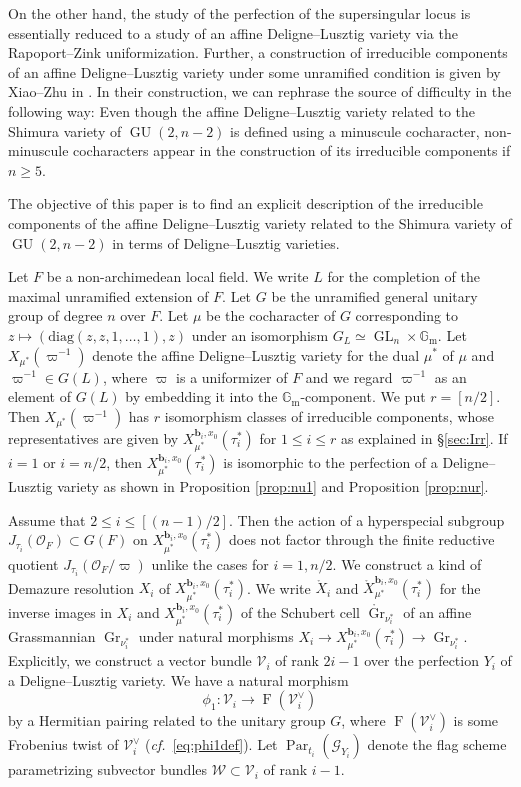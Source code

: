 \documentclass[12pt,a4paper]{article}
\DeclareMathOperator{\Gr}{Gr}
\DeclareMathOperator{\Par}{Par}
\DeclareMathOperator{\GL}{GL}
\DeclareMathOperator{\GU}{GU}
\DeclareMathOperator{\oF}{F}
\newcommand{\bfb}{\mathbf{b}}
\newcommand{\cO}{\mathcal{O}}
\newcommand{\sG}{\mathscr{G}}
\newcommand{\sV}{\mathscr{V}}
\newcommand{\sW}{\mathscr{W}}
\newcommand{\Gm}{\mathbb{G}_{\mathrm{m}}}
\newcommand{\cf}{\textit{cf.\ }}
\begin{document}
On the other hand, 
the study of the perfection of the supersingular locus is essentially reduced to a study of an affine Deligne--Lusztig variety via 
the Rapoport--Zink uniformization. 
Further, a construction of irreducible components of an 
affine Deligne--Lusztig variety under some unramified condition is given by Xiao--Zhu in \cite{XiZhCycSh}. 
In their construction, we can rephrase the source of difficulty in the following way: 
Even though the affine Deligne--Lusztig variety 
related to the Shimura variety of $\GU (2,n-2)$ 
is defined using a minuscule cocharacter, 
non-minuscule cocharacters appear in 
the construction of 
its irreducible components if $n \geq 5$. 

The objective of this paper is 
to find an explicit description of the irreducible components of the affine Deligne--Lusztig variety related to 
the Shimura variety of $\GU (2,n-2)$ in terms of 
Deligne--Lusztig varieties. 

Let $F$ be a non-archimedean local field. 
We write $L$ for the completion of the maximal unramified extension of 
$F$. 
Let $G$ be the unramified general unitary group of degree $n$ 
over $F$. 
Let $\mu$ be the cocharacter of $G$ 
corresponding to 
$z \mapsto (\mathrm{diag}(z,z,1,\ldots,1),z)$ under an 
isomorphism $G_L \simeq \GL_n \times \Gm$. 
Let $X_{\mu^*}(\varpi^{-1})$ denote the affine Deligne--Lusztig variety 
for the dual $\mu^*$ of $\mu$ and $\varpi^{-1} \in G(L)$, 
where $\varpi$ is a uniformizer of $F$ and we regard $\varpi^{-1}$ as an element of $G(L)$ by embedding it into 
the $\Gm$-component. 
We put $r=[n/2]$. 
Then $X_{\mu^*}(\varpi^{-1})$ has $r$ isomorphism classes of irreducible components, whose representatives are given by $X_{\mu^*}^{\bfb_i,x_0}(\tau_i^*)$ for $1 \leq i \leq r$ as explained in \S \ref{sec:Irr}. 
If $i=1$ or $i=n/2$, then 
$X_{\mu^*}^{\bfb_i,x_0}(\tau_i^*)$ is isomorphic to the perfection of a Deligne--Lusztig variety as shown in 
Proposition \ref{prop:nu1} and Proposition \ref{prop:nur}. 

Assume that $2 \leq i \leq [(n-1)/2]$. 
Then the action of 
a hyperspecial subgroup $J_{\tau_i}(\cO_F) \subset G(F)$ 
on $X_{\mu^*}^{\bfb_i,x_0}(\tau_i^*)$ does not factor through the finite reductive quotient $J_{\tau_i}(\cO_F/\varpi)$ unlike the cases for $i=1,n/2$. 
We construct a kind of Demazure resolution 
$X_i$ of $X_{\mu^*}^{\bfb_i,x_0}(\tau_i^*)$. 
We write $\mathring{X}_i$ and $\mathring{X}_{\mu^*}^{\bfb_i,x_0}(\tau_i^*)$ for the inverse images in 
$X_i$ and $X_{\mu^*}^{\bfb_i,x_0}(\tau_i^*)$ 
of the Schubert cell $\mathring{\Gr}_{\nu_i^*}$ of an affine Grassmannian $\Gr_{\nu_i^*}$ under natural morphisms $X_i \to X_{\mu^*}^{\bfb_i,x_0}(\tau_i^*) \to  \Gr_{\nu_i^*}$. 
Explicitly, we construct a vector bundle 
$\sV_i$ of rank $2i-1$ over the perfection $Y_i$ 
of a Deligne--Lusztig variety. 
We have a natural morphism 
\[
 \phi_1 \colon \sV_i \to \oF (\sV_i^{\vee})
\]
by a Hermitian pairing related to the unitary group $G$, where 
$\oF (\sV_i^{\vee})$ is some Frobenius twist of $\sV_i^{\vee}$ (\cf \eqref{eq:phi1def}). 
Let $\Par_{t_i}(\sG_{Y_i})$ denote the flag scheme 
parametrizing subvector bundles $\sW \subset \sV_i$ 
of rank $i-1$. 
\end{document}
